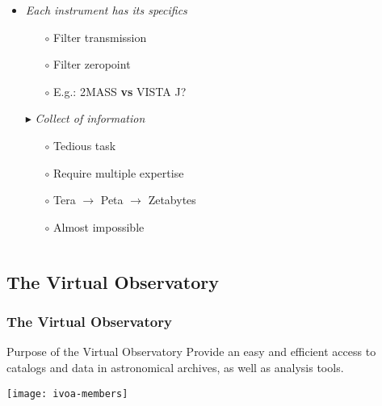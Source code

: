 \begin{frame}
\begin{columns}[T]
\begin{column}{.6\textwidth}
\begin{itemize}[<+->]
        \vspace{0.7em}
        \item \emph{Each instrument has its specifics}
          \begin{itemize}[<.->]
            \item[$\circ$] Filter transmission
            \item[$\circ$] Filter zeropoint
            \item[$\circ$] E.g.: 2MASS \textbf{vs} VISTA J?
          \end{itemize}

        \vspace{0.7em}
        \item[$\blacktriangleright$] \emph{Collect of information}
          \begin{itemize}[<.->]
            \item[$\circ$] Tedious task
            \item[$\circ$] Require multiple expertise
            \item[$\circ$] Tera $\rightarrow$ Peta $\rightarrow$ Zetabytes
            \item[$\circ$] Almost impossible
          \end{itemize}

        \end{itemize}
      \end{column}

  \end{columns}

\end{frame}



\subsection{The Virtual Observatory}
\begin{frame}
  \frametitle{The Virtual Observatory}

  \begin{block}{Purpose of the Virtual Observatory}
    Provide an easy and efficient access to catalogs and data in
    astronomical archives, as well as analysis tools.
  \end{block}

  \vspace{2em}
  \hspace{0.25\textwidth}\texttt{[image: ivoa-members]}


\end{frame}
